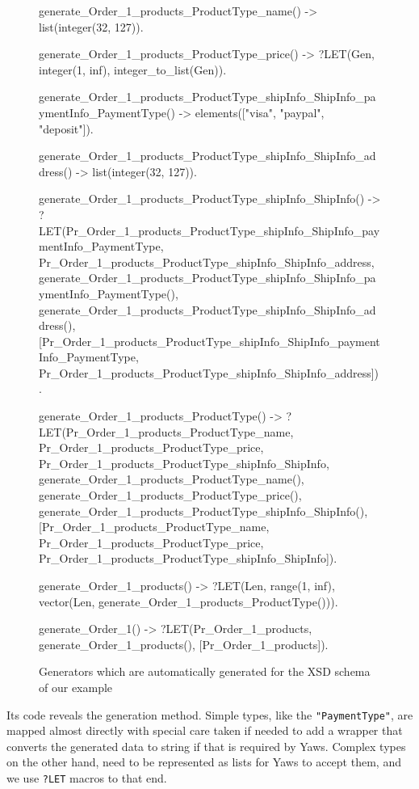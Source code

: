 \documentclass[submission,copyright]{eptcs}
\newcommand{\LET}{\texttt{?LET}\xspace}
\begin{document}
\begin{figure}
\begin{lsterlang}[xleftmargin=2em,numbers=left,numbersep=5pt]
generate_Order_1_products_ProductType_name() -> 
  list(integer(32, 127)).

generate_Order_1_products_ProductType_price() ->  
  ?LET(Gen, integer(1, inf), integer_to_list(Gen)).

generate_Order_1_products_ProductType_shipInfo_ShipInfo_paymentInfo_PaymentType() -> 
  elements(["visa", "paypal", "deposit"]).

generate_Order_1_products_ProductType_shipInfo_ShipInfo_address() -> 
  list(integer(32, 127)).

generate_Order_1_products_ProductType_shipInfo_ShipInfo() -> 
  ?LET({Pr_Order_1_products_ProductType_shipInfo_ShipInfo_paymentInfo_PaymentType,
         Pr_Order_1_products_ProductType_shipInfo_ShipInfo_address},
        {generate_Order_1_products_ProductType_shipInfo_ShipInfo_paymentInfo_PaymentType(),
         generate_Order_1_products_ProductType_shipInfo_ShipInfo_address()},
        [Pr_Order_1_products_ProductType_shipInfo_ShipInfo_paymentInfo_PaymentType,
         Pr_Order_1_products_ProductType_shipInfo_ShipInfo_address]).

generate_Order_1_products_ProductType() -> 
  ?LET({Pr_Order_1_products_ProductType_name, 
         Pr_Order_1_products_ProductType_price, 
         Pr_Order_1_products_ProductType_shipInfo_ShipInfo},
        {generate_Order_1_products_ProductType_name(), 
         generate_Order_1_products_ProductType_price(), 
         generate_Order_1_products_ProductType_shipInfo_ShipInfo()},
        [Pr_Order_1_products_ProductType_name, 
         Pr_Order_1_products_ProductType_price, 
         Pr_Order_1_products_ProductType_shipInfo_ShipInfo]).

generate_Order_1_products() -> 
  ?LET(Len, range(1, inf), vector(Len, generate_Order_1_products_ProductType())).

generate_Order_1() -> 
  ?LET(Pr_Order_1_products, generate_Order_1_products(), [Pr_Order_1_products]).
\end{lsterlang}
\caption{Generators which are automatically generated for the XSD
  schema of our example}
\label{fig:generators}
\end{figure}

Its code reveals the generation method. Simple types, like the
\texttt{"PaymentType"}, are mapped almost directly with special care
taken if needed to add a wrapper that converts the generated data to
string if that is required by Yaws. Complex types on the other hand,
need to be represented as lists for Yaws to accept them, and we use
\LET macros to that end.
\end{document}
